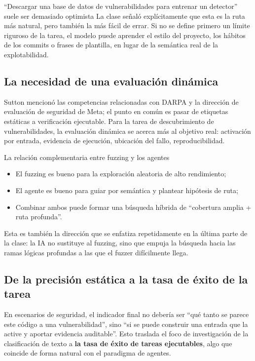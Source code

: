 \documentclass[a4paper]{article}
\begin{document}
\begin{warningbox}{``Descargar una base de datos de vulnerabilidades para entrenar un detector'' suele ser demasiado optimista}
La clase señaló explícitamente que esta es la ruta más natural, pero también la más fácil de errar. Si no se define primero un límite riguroso de la tarea, el modelo puede aprender el estilo del proyecto, los hábitos de los commits o frases de plantilla, en lugar de la semántica real de la explotabilidad.
\end{warningbox}

\subsection{La necesidad de una evaluación dinámica}
Sutton mencionó las competencias relacionadas con DARPA y la dirección de evaluación de seguridad de Meta; el punto en común es pasar de etiquetas estáticas a verificación ejecutable. Para la tarea de descubrimiento de vulnerabilidades, la evaluación dinámica se acerca más al objetivo real: activación por entrada, evidencia de ejecución, ubicación del fallo, reproducibilidad.

\begin{knowledgebox}{La relación complementaria entre fuzzing y los agentes}
\begin{itemize}
    \item El fuzzing es bueno para la exploración aleatoria de alto rendimiento;
    \item El agente es bueno para guiar por semántica y plantear hipótesis de ruta;
    \item Combinar ambos puede formar una búsqueda híbrida de ``cobertura amplia + ruta profunda''.
\end{itemize}
Esta es también la dirección que se enfatiza repetidamente en la última parte de la clase: la IA no sustituye al fuzzing, sino que empuja la búsqueda hacia las ramas lógicas profundas a las que el fuzzer difícilmente llega.
\end{knowledgebox}

\subsection{De la precisión estática a la tasa de éxito de la tarea}
En escenarios de seguridad, el indicador final no debería ser ``qué tanto se parece este código a una vulnerabilidad'', sino ``si se puede construir una entrada que la active y aportar evidencia auditable''. Esto traslada el foco de investigación de la clasificación de texto a \textbf{la tasa de éxito de tareas ejecutables}, algo que coincide de forma natural con el paradigma de agentes.
\end{document}
